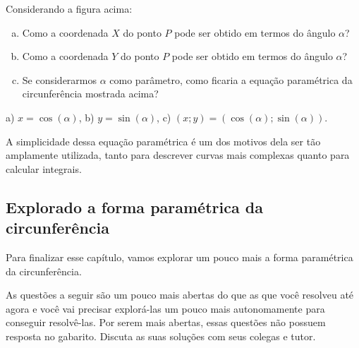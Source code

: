 \documentclass[main.tex]{subfiles}
\begin{document}
\begin{questao}
Considerando a figura acima:
\begin{enumerate}[a)]
\item Como a coordenada $X$ do ponto $P$ pode ser obtido em termos do ângulo $\alpha$?
\item Como a coordenada $Y$ do ponto $P$ pode ser obtido em termos do ângulo $\alpha$?
\item Se considerarmos $\alpha$ como parâmetro, como ficaria a equação paramétrica da circunferência mostrada acima?
\end{enumerate} 
\end{questao}


\begin{gabarito}
	\begin{gabaritoQuestao}
		a) $x=\cos(\alpha)$, b) $y=\sin(\alpha)$,  c) $(x;y)=(\cos(\alpha);\sin(\alpha))$.
	\end{gabaritoQuestao}
\end{gabarito}

A simplicidade dessa equação paramétrica é um dos motivos dela ser tão amplamente utilizada, tanto para descrever curvas mais complexas quanto para calcular integrais.

\subsection*{Explorado a forma paramétrica da circunferência}

Para finalizar esse capítulo, vamos explorar um pouco mais a forma paramétrica  da circunferência.

As questões a seguir são um pouco mais abertas do que as que você resolveu até agora e você vai precisar explorá-las um pouco mais autonomamente para conseguir resolvê-las. Por serem mais abertas, essas questões não possuem resposta no gabarito. Discuta as suas soluções com seus colegas e tutor.

\end{document}
